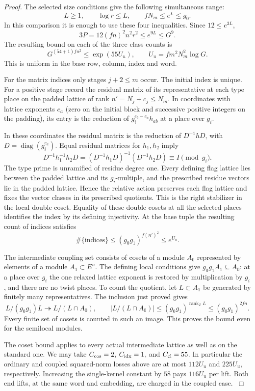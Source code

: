 \begin{proof}
The selected size conditions give the following simultaneous range:
\[
 L\ge1,\qquad\log r\le L,\qquad fN_m\le e^L\le g_0 .
\] In this comparison it is
enough to use these four inequalities. Since \(12\le e^{3L}\),
\[
         3P=12(fn)^2 n^2 r^2\le e^{9L}\le G^9 .
\]
The resulting bound on each of the three class counts is
\[
 G^{(54+1)fn^2}\le\exp(55U_u),\qquad U_u=fm^2N_m^2\log G .
\] This is uniform in the base row,
column, index and word. \label{cor:selected-class-counts-2}

For the matrix indices only stages \(j+2\le m\) occur. The
initial index is unique. For a positive stage record the residual
matrix of its representative at each type place on the padded
lattice of rank \(n'=N_j+c_j\le N_m\). In coordinates with lattice
exponents \(e_a\) (zero on the initial block and successive
positive integers on the padding), its entry is the reduction of
\(g_i^{e_b-e_a}h_{ab}\) at a place over \(g_i\).

In these coordinates the residual matrix is the reduction of
\(D^{-1}hD\), with \(D=\operatorname{diag}(g_i^{e_a})\). Equal
residual matrices for \(h_1,h_2\) imply
\[
 D^{-1}h_1^{-1}h_2D
     =(D^{-1}h_1D)^{-1}(D^{-1}h_2D)\equiv I\pmod{g_i}.
\] The type prime is unramified of residue degree one.
Every defining flag lattice lies between the padded lattice and
its \(g_i\)-multiple, and the prescribed residue vectors lie in the
padded lattice. Hence the relative action preserves each flag
lattice and fixes the vector classes in its prescribed quotients.
This is the right stabilizer in the local double coset. Equality
of these double cosets at all the selected places identifies the
index by its defining injectivity. At the base tuple the resulting count of indices satisfies
\[
 \#\{\text{indices}\}\le(g_0g_1)^{f(n')^2}\le e^{U_u}.
\]

The intermediate coupling set consists of cosets of a module
\(A_0\) represented by elements of a module \(A_1\subset E^n\).
The defining local conditions give \(g_0g_1 A_1\subseteq A_0\):
at a place over \(g_i\) the one relaxed lattice exponent is
restored by multiplication by \(g_i\), and there are no twist
places. To count the quotient, let \(L\subset A_1\) be generated by
finitely many representatives. The inclusion just proved gives
\[
 L/(g_0g_1)L\twoheadrightarrow L/(L\cap A_0),\qquad
 |L/(L\cap A_0)|\le (g_0g_1)^{\operatorname{rank}_{\mathbb Z}L}
                 \le (g_0g_1)^{2fn}.
\]
Every finite set of cosets is counted in such an image. This proves the bound even for the semilocal modules.

The coset bound applies to every actual intermediate lattice as well as on the
standard one. We may take \(C_{\rm cos}=2\),
\(C_{\rm idx}=1\), and \(C_{\rm cl}=55\). In particular the
ordinary and coupled squared-norm losses above are at most
\(112 U_u\) and \(225 U_u\), respectively. Increasing the
single-kernel constant by \(58\) pays \(116U_u\) per lift.
Both end lifts, at the same word and embedding, are charged
in the coupled case. \label{cor:selected-class-counts-3}
\end{proof}

